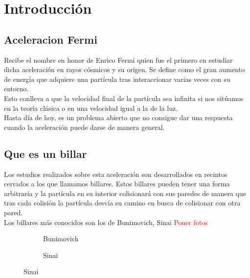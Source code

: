 \documentclass[11pt, spanish]{article}
\begin{document}
\section{Introducción}

\subsection{Aceleracion Fermi}

Recibe el nombre en honor de Enrico Fermi quien fue el primero en estudiar dicha aceleración en rayos cósmicos y su origen. Se define como el gran aumento de energía que adquiere una partícula tras interaccionar varias veces con su entorno. \\

Esto conlleva a que la velocidad final de la partícula sea infinita si nos sitúamos en la teoría clásica o en una velocidad igual a la de la luz. \\

Hasta día de hoy, es un problema abierto que no consigue dar una respuesta cuando la aceleración puede darse de manera general.\\ 

\subsection{Que es un billar}

Los estudios realizados sobre esta aceleración son desarrollados en recintos cerrados a los que llamamos billares. Estos billares pueden tener una forma arbitraria y la partícula en su interior colisionará con sus paredes de manera que tras cada colisión la partícula desvía su camino en busca de colisionar con otra pared. \\

Los billares más conocidos son los de Bunimovich, Sinai \textcolor{red}{Poner fotos}\\

\begin{figure}[!h]
    \centering
    \begin{subfigure}[b]{0.49\textwidth}
        \centering
        \caption{Bunimovich}
        \label{fig:Bunimovich}
    \end{subfigure}
    \hfill
    \begin{subfigure}[b]{0.49\textwidth}
        \centering
        \caption{Sinai}
        \label{fig:Bunimovich}
    \end{subfigure}
\end{figure}
\end{document}
